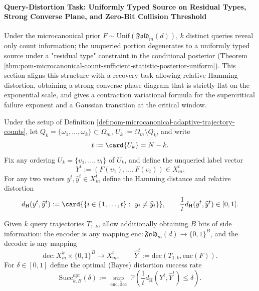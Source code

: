 
\paragraph{Query-Distortion Task: Uniformly Typed Source on Residual Types, Strong Converse Plane, and Zero-Bit Collision Threshold}
Under the microcanonical prior \(F\sim\mathrm{Unif}(\mathfrak{Fold}_m(d))\), \(k\) distinct queries reveal only count information;
the unqueried portion degenerates to a uniformly typed source under a "residual type" constraint in the conditional posterior (Theorem \ref{thm:pom-microcanonical-count-sufficient-statistic-posterior-uniform}).
This section aligns this structure with a recovery task allowing relative Hamming distortion, obtaining a strong converse phase diagram that is strictly flat on the exponential scale,
and gives a contraction variational formula for the supercritical failure exponent and a Gaussian transition at the critical window.

\begin{definition}\label{def:pom-microcanonical-query-distortion-setup}
Under the setup of Definition \ref{def:pom-microcanonical-adaptive-trajectory-counts},
let \(Q_k=\{\omega_1,\dots,\omega_k\}\subset\Omega_m\), \(U_k:=\Omega_m\setminus Q_k\), and write
\[
t:=\card{U_k}=N-k.
\]
Fix any ordering \(U_k=\{\upsilon_1,\dots,\upsilon_t\}\) of \(U_k\), and define the unqueried label vector
\[
Y^t:=(F(\upsilon_1),\dots,F(\upsilon_t))\in X_m^t.
\]
For any two vectors \(y^t,\widehat y^t\in X_m^t\) define the Hamming distance and relative distortion
\[
d_{\mathrm H}(y^t,\widehat y^t):=\card{\{i\in\{1,\dots,t\}:\ y_i\neq \widehat y_i\}},
\qquad
\frac{1}{t}d_{\mathrm H}(y^t,\widehat y^t)\in[0,1].
\]
\end{definition}

\begin{definition}\label{def:pom-microcanonical-query-distortion-success}
Given \(k\) query trajectories \(T_{1:k}\), allow additionally obtaining \(B\) bits of side information:
the encoder is any mapping \(\mathrm{enc}:\mathfrak{Fold}_m(d)\to\{0,1\}^B\), and the decoder is any mapping
\[
\mathrm{dec}:X_m^k\times\{0,1\}^B\to X_m^t,
\qquad
\widehat Y^t:=\mathrm{dec}(T_{1:k},\mathrm{enc}(F)).
\]
For \(\delta\in[0,1]\) define the optimal (Bayes) distortion success rate
\[
\mathrm{Succ}^{\mathrm{opt}}_{k,B}(\delta)
:=\sup_{\mathrm{enc},\mathrm{dec}}\ \mathbb{P}\!\left(\frac{1}{t}d_{\mathrm H}(Y^t,\widehat Y^t)\le \delta\right).
\]
\end{definition}

